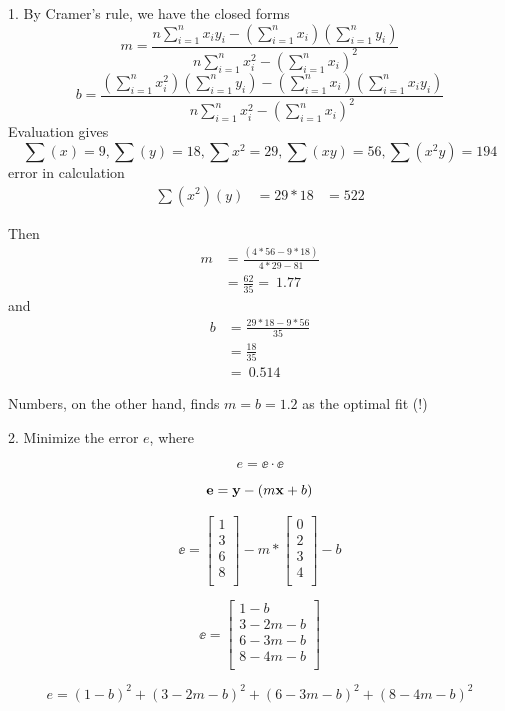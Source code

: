 \documentclass[12pt,letterpaper]{hmcpset}
\begin{document}
\begin{solution}
1. By Cramer's rule, we have the closed forms
\[
    m = \frac{n\sum_{i=1}^n x_iy_i - (\sum_{i=1}^n x_i)(\sum_{i=1}^n y_i)}{n\sum_{i=1}^n x_i^2 - (\sum_{i=1}^n x_i)^2}
\]
\[
    b = \frac{(\sum_{i=1}^n x_i^2) (\sum_{i=1}^n y_i) - (\sum_{i=1}^n x_i)(\sum_{i=1}^n x_iy_i)}{n\sum_{i=1}^n x_i^2 - (\sum_{i=1}^n x_i)^2}
\]
Evaluation gives
\[
\sum(x) = 9, \sum(y) = 18, \sum{x^2} = 29, \sum(xy) = 56, \sum(x^2y) = 194
\]
error in calculation
\[
\begin{aligned}
\sum(x^2)(y) & = 29 * 18 
& = 522
\end{aligned}
\]

Then
\[
\begin{aligned}
m & = \frac{(4*56 - 9*18)}{4*29 - 81} \\
& = \frac{62}{35} =~ 1.77
\end{aligned}
\]
and
\[
\begin{aligned}
b & = \frac{29*18 - 9*56}{35} \\
& = \frac{18}{35} \\
& =~ 0.514
\end{aligned}
\]

Numbers, on the other hand, finds $m = b = 1.2$ as the optimal fit (!)

2. Minimize the error $e$, where

\[
 e = \ee \cdot \ee
\]

\[
 {\bf e} = {\bf y} - ( m {\bf x} + b )
\]

\[
 \ee =
 \begin{bmatrix}
   1 \\
   3 \\
   6 \\
   8 \\
\end{bmatrix}
 - m *
\begin{bmatrix}
  0 \\
  2 \\
  3 \\
  4 \\
\end{bmatrix}
 - b
\]

\[
 \ee =
 \begin{bmatrix}
   1 - b\\
   3 - 2m - b\\
   6 - 3m - b\\
   8 - 4m - b\\
\end{bmatrix}
 \]

\[
e = (1-b)^2 + (3 - 2m - b)^2 + (6 - 3m - b)^2 + (8 - 4m - b)^2
\]


\end{solution}
\end{document}
